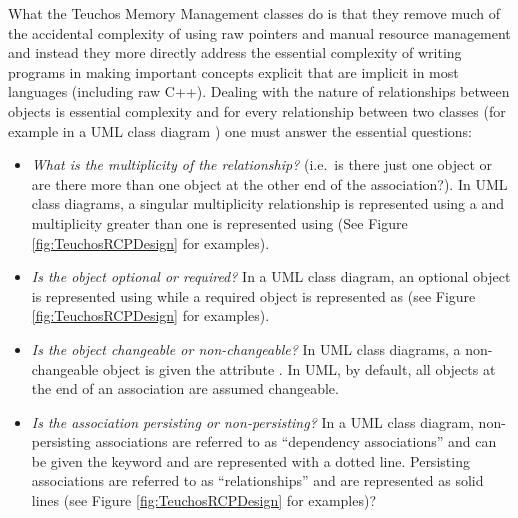 \documentclass[pdf,ps2pdf,11pt]{SANDreport}
\begin{document}
What the Teuchos Memory Management classes do is that they remove much
of the accidental complexity of using raw pointers and manual resource
management and instead they more directly address the essential
complexity of writing programs in making important concepts explicit
that are implicit in most languages (including raw C++).  Dealing with
the nature of relationships between objects is essential complexity
and for every relationship between two classes (for example in a UML
class diagram {}\cite{UMLDistilledThirdEdition04}) one must answer the
essential questions:

\begin{itemize}

{}\item\textit{What is the multiplicity of the relationship?}  (i.e.\
is there just one object or are there more than one object at the
other end of the association?).  In UML class diagrams, a singular
multiplicity relationship is represented using a {}\ttt{1} and
multiplicity greater than one is represented using {}
(See Figure {}\ref{fig:TeuchosRCPDesign} for examples).

{}\item\textit{Is the object optional or required?}  In a UML class
diagram, an optional object is represented using {}\ttt{0..1} while
a required object is represented as {}\ttt{1} (see Figure
{}\ref{fig:TeuchosRCPDesign} for examples).

{}\item\textit{Is the object changeable or non-changeable?}  In UML
class diagrams, a non-changeable object is given the attribute
{}.  In UML, by default, all objects at the end
of an association are assumed changeable.

{}\item\textit{Is the association persisting or non-persisting?}  In a
UML class diagram, non-persisting associations are referred to as
``dependency associations'' and can be given the keyword
{} and are represented with a dotted line.
Persisting associations are referred to as ``relationships'' and are
represented as solid lines (see Figure {}\ref{fig:TeuchosRCPDesign}
for examples)?

\end{itemize}
\end{document}
